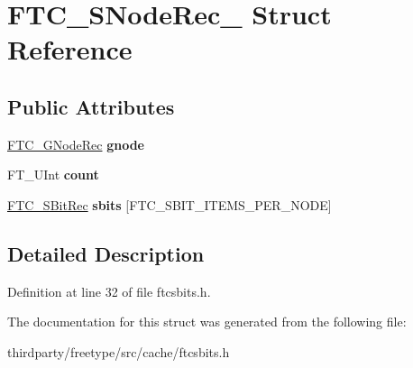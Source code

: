 \hypertarget{struct_f_t_c___s_node_rec__}{}\section{F\+T\+C\+\_\+\+S\+Node\+Rec\+\_\+ Struct Reference}
\label{struct_f_t_c___s_node_rec__}
\subsection*{Public Attributes}
\begin{DoxyCompactItemize}
\item 
\mbox{\label{struct_f_t_c___s_node_rec___a52a3de3fef9423a3ac1ff56776234b19}} 
\hyperlink{struct_f_t_c___g_node_rec__}{F\+T\+C\+\_\+\+G\+Node\+Rec} {\bfseries gnode}
\item 
\mbox{\label{struct_f_t_c___s_node_rec___af3969cbfd3cde3f8f33ba8c973881361}} 
F\+T\+\_\+\+U\+Int {\bfseries count}
\item 
\mbox{\label{struct_f_t_c___s_node_rec___a2f91dcf10e4b0c8b7ca9169d1c8f3573}} 
\hyperlink{struct_f_t_c___s_bit_rec__}{F\+T\+C\+\_\+\+S\+Bit\+Rec} {\bfseries sbits} \mbox{[}F\+T\+C\+\_\+\+S\+B\+I\+T\+\_\+\+I\+T\+E\+M\+S\+\_\+\+P\+E\+R\+\_\+\+N\+O\+DE\mbox{]}
\end{DoxyCompactItemize}


\subsection{Detailed Description}


Definition at line 32 of file ftcsbits.\+h.



The documentation for this struct was generated from the following file\+:\begin{DoxyCompactItemize}
\item 
thirdparty/freetype/src/cache/ftcsbits.\+h\end{DoxyCompactItemize}

